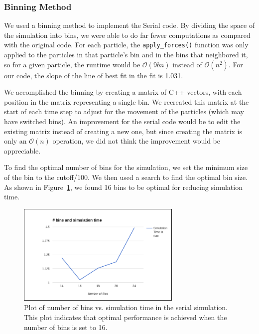\documentclass{article}
\begin{document}
\subsubsection{Binning Method}
We used a binning method to implement the Serial code. By dividing the space
of the simulation into bins, we were able to do far fewer computations as
compared with the original code. For each particle, the
\texttt{apply\_forces()} function was only applied to the particles in that
particle's bin and in the bins that neighbored it, so for a given particle, the
runtime would be $\mathcal{O}(9b n)$ instead of $\mathcal{O}(n^2)$. For our
code, the slope of the line of best fit in the  fit is
1.031.

We accomplished the binning by creating a matrix of C++ vectors, with each
position in the matrix representing a single bin. We recreated this matrix at
the start of each time step to adjust for the movement of the particles (which
may have switched bins). An improvement for the serial code would be to edit the
existing matrix instead of creating a new one, but since creating the matrix is
only an $\mathcal{O}(n)$ operation, we did not think the improvement would be
appreciable.

To find the optimal number of bins for the simulation, we set the minimum size
of the bin to the cutoff/100.  We then used a search to find the optimal bin
size. As shown in Figure~\ref{fig:bin_time}, we found 16 bins to be optimal for
reducing simulation time.

\begin{figure}[ht]
\centering
\includegraphics[width=0.7\textwidth]{Picture1.png}
\caption{Plot of number of bins vs. simulation time in the serial simulation.
  This plot indicates that optimal performance is achieved when the number of
  bins is set to 16.}
\label{fig:bin_time}
\end{figure}
\end{document}
